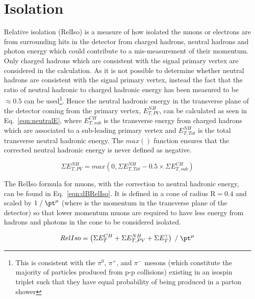 \section{Isolation \label{sec:isolation}}

Relative isolation (RelIso) is a measure of how isolated the muons or electrons are from surrounding hits in the detector from charged hadrons, neutral hadrons and photon energy which could contribute to a mis-measurement of their momentum. Only charged hadrons which are consistent with the signal primary vertex are considered in the calculation. As it is not possible to determine whether neutral hadrons are consistent with the signal primary vertex, instead the fact that the ratio of neutral hadronic to charged hadronic energy has been measured to be $\approx 0.5$ can be used\footnote{This is consistent with the $\pi^{0}$, $\pi^{+}$, and $\pi^{-}$ mesons (which constitute the majority of particles produced from p-p collisions) existing in an isospin triplet such that they have equal probability of being produced in a parton shower}. Hence the neutral hadronic energy in the transverse plane of the detector coming from the primary vertex, $E_{T,PV}^{NH}$, can be calculated as seen in Eq.~\ref{eqn:neutralE}, where $E_{T,sub}^{CH}$ is the transverse energy from charged hadrons which are associated to a sub-leading primary vertex and $E_{T,Tot}^{NH}$ is the total transverse neutral hadronic energy. 
 The $max()$ function ensures that the corrected neutral hadronic energy is never defined as negative.


\begin{centering}
\begin{equation}
\Sigma E_{T,PV}^{NH}  =  max(0, \Sigma E_{T,Tot}^{NH} - 0.5\times \Sigma E_{T,sub}^{CH})
\label{eqn:neutralE}
\end{equation}
\end{centering}



The RelIso formula for muons, with the correction to neutral hadronic energy, can be found in Eq.~\ref{eqn:dBRelIso}. It is defined in a cone of radius $\textrm{R}=0.4$ and scaled by $1\; / \;\pt^{\mu}$ (where \pt is the momentum in the transverse plane of the detector) so that lower momentum muons are required to have less energy from hadrons and photons in the cone to be considered isolated.

\begin{centering}
\begin{equation}
RelIso = \left( \Sigma E_{T}^{CH} + \Sigma E_{T,PV}^{NH} +  \Sigma E_{T}^{\gamma} \right) \; / \;   \pt^{\mu}
\label{eqn:dBRelIso}
\end{equation}
\end{centering}


